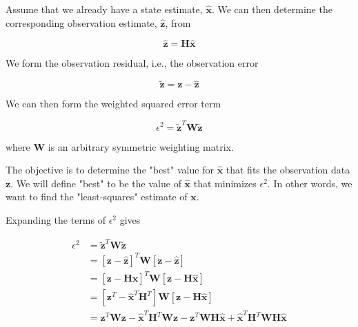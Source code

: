 Assume that we already have a state estimate, $\hat{\mathbf{x}}$. We can then determine the
corresponding observation estimate, $\hat{\mathbf{z}}$, from

\begin{equation*}
    \hat{\mathbf{z}} = \mathbf{H} \hat{\mathbf{x}}
\end{equation*}

We form the observation residual, i.e., the observation error

\begin{equation*}
    \tilde{\mathbf{z}} = \mathbf{z} - \hat{\mathbf{z}}
\end{equation*}

We can then form the weighted squared error term

\begin{equation*}
    \epsilon^2 = \tilde{\mathbf{z}}^T \mathbf{W} \tilde{\mathbf{z}}
\end{equation*}

where $\mathbf{W}$ is an arbitrary symmetric weighting matrix.

The objective is to determine the "best" value for $\hat{\mathbf{x}}$ that fits the
observation data $\mathbf{z}$. We will define "best" to be the value of $\hat{\mathbf{x}}$
that minimizes $\epsilon^2$. In other words, we want to find the "least-squares"
estimate of $\mathbf{x}$.

Expanding the terms of $\epsilon^2$ gives

\begin{equation*}
    \begin{aligned}
        \epsilon^2 &= \tilde{\mathbf{z}}^T \mathbf{W} \tilde{\mathbf{z}} \\
                   &= \left[ \mathbf{z} - \hat{\mathbf{z}} \right]^T \mathbf{W} \left[ \mathbf{z} - \hat{\mathbf{z}} \right] \\
                   &= \left[ \mathbf{z} - \mathbf{H} \hat{\mathbf{x}} \right]^T \mathbf{W} \left[ \mathbf{z} - \mathbf{H} \hat{\mathbf{x}} \right] \\
                   &= \left[ \mathbf{z}^T - \hat{\mathbf{x}}^T \mathbf{H}^T \right] \mathbf{W} \left[ \mathbf{z} - \mathbf{H} \hat{\mathbf{x}} \right] \\
                   &= \mathbf{z}^T \mathbf{W} \mathbf{z} - \hat{\mathbf{x}}^T \mathbf{H}^T \mathbf{W} \mathbf{z}
                      - \mathbf{z}^T \mathbf{W} \mathbf{H} \hat{\mathbf{x}} + \hat{\mathbf{x}}^T \mathbf{H}^T \mathbf{W} \mathbf{H} \hat{\mathbf{x}}
    \end{aligned}
\end{equation*}

